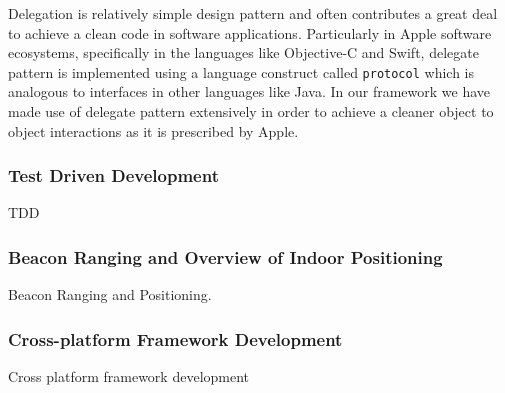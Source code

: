 \begin{itemize}
	\par Delegation is relatively simple design pattern and often contributes a great deal to achieve a clean code in software applications. Particularly in Apple software ecosystems, specifically in the languages like Objective-C and Swift, delegate pattern is implemented using a language construct called \texttt{protocol} \cite{wikidelegation} which is analogous to interfaces in other languages like Java. In our framework we have made use of delegate pattern extensively in order to achieve a cleaner object to object interactions as it is prescribed by Apple.
\end{itemize}

\subsubsection{Test Driven Development}
TDD 

\subsubsection{Beacon Ranging and Overview of Indoor Positioning}
Beacon Ranging and Positioning.

\subsubsection{Cross-platform Framework Development}
Cross platform framework development
